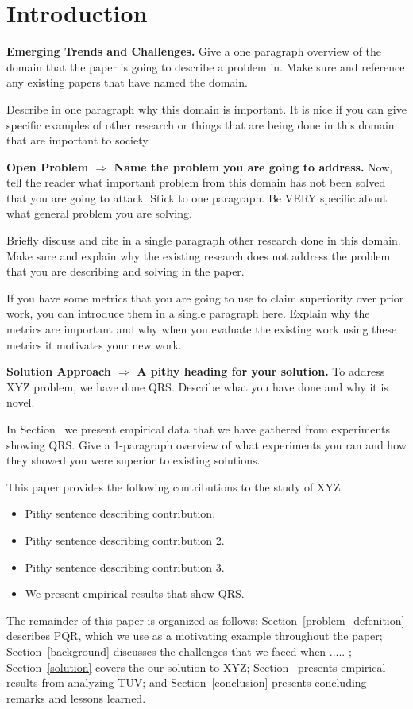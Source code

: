 \section{Introduction}

\textbf{Emerging Trends and Challenges.}
Give a one paragraph overview of the domain that
the paper is going to describe a problem in. Make
sure and reference any existing papers that have
named the domain.

Describe in one paragraph why this domain is important.
It is nice if you can give specific examples of other
research or things that are being done in this domain
that are important to society.

\textbf{Open Problem $\Rightarrow$ Name the problem
you are going to address.}
Now, tell the reader what important problem from
this domain has not been solved that you are going
to attack. Stick to one paragraph. Be VERY specific about what general
problem you are solving.

Briefly discuss and cite in a single paragraph other
research done in this domain. Make sure and explain
why the existing research does not address the
problem that you are describing and solving in the
paper.

If you have some metrics that you are going
to use to claim superiority over prior work, you
can introduce them in a single paragraph here.
Explain why the metrics are important and why
when you evaluate the existing work using these
metrics it motivates your new work.

\textbf{Solution Approach $\Rightarrow$ A pithy
heading for your solution.} To address XYZ
problem, we have done QRS. Describe what you
have done and why it is novel.

In Section~ we present empirical
data that we have gathered from experiments
showing QRS. Give a 1-paragraph overview of
what experiments you ran and how they showed
you were superior to existing solutions.

This paper provides the following contributions
to the study of XYZ:

\begin{itemize}

\item Pithy sentence describing contribution.

\item Pithy sentence describing contribution 2.

\item Pithy sentence describing contribution 3.

\item We present empirical results that show QRS.

\end{itemize}

%
The remainder of this paper is organized as follows:
Section~\ref{problem_defenition} describes PQR, which we
use as a motivating example throughout the paper;
Section~\ref{background} discusses the challenges that
we faced when ..... ; Section~\ref{solution} covers the our solution to XYZ; Section~ presents empirical
results from analyzing TUV; and Section~\ref{conclusion}
presents concluding remarks and lessons learned.
